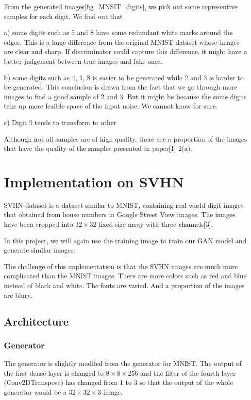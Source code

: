 \documentclass{article}
\begin{document}
From the generated images\ref{fig_MNSIT_digits}, we pick out some representive samples for each digit. We find out that 

a) some digits such as 5 and 8 have some redundant white marks around the edges. This is a huge difference from the original MNIST dataset whose images are clear and sharp. If discriminator could capture this difference, it might have a better judgement between true images and fake ones.

b) some digits such as 4, 1, 8 is easier to be generated while 2 and 3 is harder to be generated. This conclusion is drawn from the fact that we go through more images to find a good sample of 2 and 3. But it might be because the some digits take up more feaible space of the input noise. We cannot know for sure.

c) Digit 9 tends to transform to other 

Although not all samples are of high quality, there are a proportion of the images that have the quality of the samples presented in paper[1] 2(a).

\section{Implementation on SVHN}

SVHN dataset is a dataset similar to MNIST, containing real-world digit images that obtained from house numbers in Google Street View images.
The images have been cropped into $32\times 32$ fixed-size array with three channels[3].

In this project, we will again use the training image to train our GAN model and generate similar images.

The challenge of this implementation is that the SVHN images are much more complicated than the MNIST images. 
There are more colors such as red and blue instead of black and white. The fonts are varied. And a proportion of the images are blury.

\subsection{Architecture}

\subsubsection{Generator}

The generator is slightly modifed from the generator for MNIST. 
The output of the first dense layer is changed to $8\times 8\times 256$ 
and the filter of the fourth layer (Conv2DTranspose) has changed from 1 to 3
so that the output of the whole generator would be a $32\times 32\times 3$ image.
\end{document}
